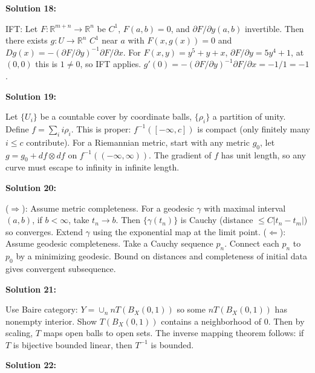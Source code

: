 \documentclass[12pt,a4paper]{exam}
\begin{document}
\vspace{0.5cm}

\textbf{Solution 18:}

IFT: Let $F: \mathbb{R}^{m+n} \to \mathbb{R}^n$ be $C^1$, $F(a,b)=0$, and $\partial F/\partial y (a,b)$ invertible. Then there exists $g: U \to \mathbb{R}^n$ $C^1$ near $a$ with $F(x,g(x))=0$ and $Dg(x) = -(\partial F/\partial y)^{-1} \partial F/\partial x$. For $F(x,y) = y^5 + y + x$, $\partial F/\partial y = 5y^4 + 1$, at $(0,0)$ this is $1 \neq 0$, so IFT applies. $g'(0) = - (\partial F/\partial y)^{-1} \partial F/\partial x = -1/1 = -1$.

\vspace{0.5cm}

\textbf{Solution 19:}

Let $\{U_i\}$ be a countable cover by coordinate balls, $\{\rho_i\}$ a partition of unity. Define $f = \sum_i i \rho_i$. This is proper: $f^{-1}([-\infty, c])$ is compact (only finitely many $i \leq c$ contribute). For a Riemannian metric, start with any metric $g_0$, let $g = g_0 + df \otimes df$ on $f^{-1}((-\infty, \infty))$. The gradient of $f$ has unit length, so any curve must escape to infinity in infinite length.

\vspace{0.5cm}

\textbf{Solution 20:}

($\Rightarrow$): Assume metric completeness. For a geodesic $\gamma$ with maximal interval $(a,b)$, if $b < \infty$, take $t_n \to b$. Then $\{\gamma(t_n)\}$ is Cauchy (distance $\leq C|t_n - t_m|$) so converges. Extend $\gamma$ using the exponential map at the limit point. ($\Leftarrow$): Assume geodesic completeness. Take a Cauchy sequence $p_n$. Connect each $p_n$ to $p_0$ by a minimizing geodesic. Bound on distances and completeness of initial data gives convergent subsequence.

\vspace{0.5cm}

\textbf{Solution 21:}

Use Baire category: $Y = \cup_n n T(B_X(0,1))$ so some $nT(B_X(0,1))$ has nonempty interior. Show $T(B_X(0,1))$ contains a neighborhood of 0. Then by scaling, $T$ maps open balls to open sets. The inverse mapping theorem follows: if $T$ is bijective bounded linear, then $T^{-1}$ is bounded.

\vspace{0.5cm}

\textbf{Solution 22:}
\end{document}
